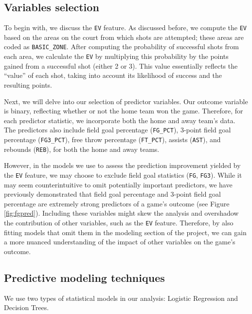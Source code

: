 \documentclass[
  12pt,
  a4paper,
]{article}
\begin{document}
\hypertarget{variables-selection}{%
\subsection{Variables selection}\label{variables-selection}}

To begin with, we discuss the \texttt{EV} feature. As discussed before, we compute the \texttt{EV} based on the areas on the court from which shots are attempted; these areas are coded as \texttt{BASIC\_ZONE}. After computing the probability of successful shots from each area, we calculate the \texttt{EV} by multiplying this probability by the points gained from a successful shot (either 2 or 3). This value essentially reflects the ``value'' of each shot, taking into account its likelihood of success and the resulting points.

Next, we will delve into our selection of predictor variables. Our outcome variable is binary, reflecting whether or not the home team won the game. Therefore, for each predictor statistic, we incorporate both the home and away team's data. The predictors also include field goal percentage (\texttt{FG\_PCT}), 3-point field goal percentage (\texttt{FG3\_PCT}), free throw percentage (\texttt{FT\_PCT}), assists (\texttt{AST}), and rebounds (\texttt{REB}), for both the home and away teams.

However, in the models we use to assess the prediction improvement yielded by the \texttt{EV} feature, we may choose to exclude field goal statistics (\texttt{FG}, \texttt{FG3}). While it may seem counterintuitive to omit potentially important predictors, we have previously demonstrated that field goal percentage and 3-point field goal percentage are extremely strong predictors of a game's outcome (see Figure \ref{fig:fgpred}). Including these variables might skew the analysis and overshadow the contribution of other variables, such as the \texttt{EV} feature. Therefore, by also fitting models that omit them in the modeling section of the project, we can gain a more nuanced understanding of the impact of other variables on the game's outcome.

\hypertarget{predictive-modeling-techniques}{%
\subsection{Predictive modeling techniques}\label{predictive-modeling-techniques}}

We use two types of statistical models in our analysis: Logistic Regression and Decision Trees.
\end{document}
